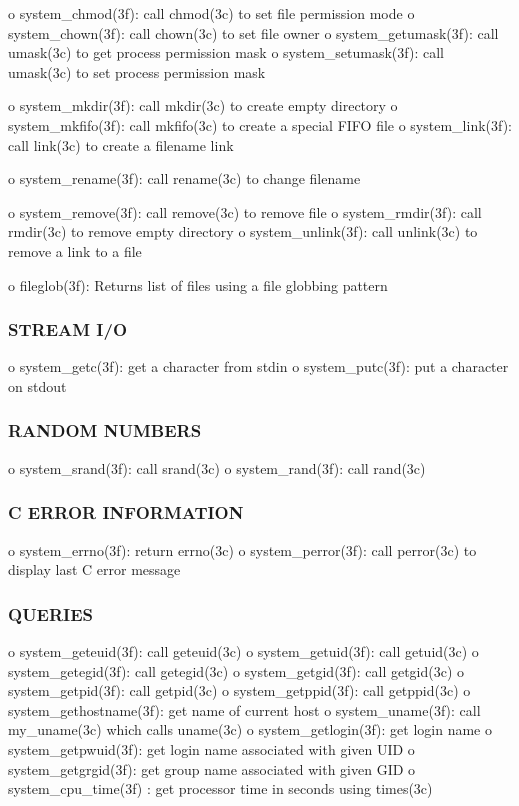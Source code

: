 o system\+\_\+chmod(3f)\+: call chmod(3c) to set file permission mode o system\+\_\+chown(3f)\+: call chown(3c) to set file owner o system\+\_\+getumask(3f)\+: call umask(3c) to get process permission mask o system\+\_\+setumask(3f)\+: call umask(3c) to set process permission mask

o system\+\_\+mkdir(3f)\+: call mkdir(3c) to create empty directory o system\+\_\+mkfifo(3f)\+: call mkfifo(3c) to create a special F\+I\+FO file o system\+\_\+link(3f)\+: call link(3c) to create a filename link

o system\+\_\+rename(3f)\+: call rename(3c) to change filename

o system\+\_\+remove(3f)\+: call remove(3c) to remove file o system\+\_\+rmdir(3f)\+: call rmdir(3c) to remove empty directory o system\+\_\+unlink(3f)\+: call unlink(3c) to remove a link to a file

o fileglob(3f)\+: Returns list of files using a file globbing pattern

\subsubsection*{S\+T\+R\+E\+AM I/O}

o system\+\_\+getc(3f)\+: get a character from stdin o system\+\_\+putc(3f)\+: put a character on stdout \subsubsection*{R\+A\+N\+D\+OM N\+U\+M\+B\+E\+RS}

o system\+\_\+srand(3f)\+: call srand(3c) o system\+\_\+rand(3f)\+: call rand(3c) \subsubsection*{C E\+R\+R\+OR I\+N\+F\+O\+R\+M\+A\+T\+I\+ON}

o system\+\_\+errno(3f)\+: return errno(3c) o system\+\_\+perror(3f)\+: call perror(3c) to display last C error message \subsubsection*{Q\+U\+E\+R\+I\+ES}

o system\+\_\+geteuid(3f)\+: call geteuid(3c) o system\+\_\+getuid(3f)\+: call getuid(3c) o system\+\_\+getegid(3f)\+: call getegid(3c) o system\+\_\+getgid(3f)\+: call getgid(3c) o system\+\_\+getpid(3f)\+: call getpid(3c) o system\+\_\+getppid(3f)\+: call getppid(3c) o system\+\_\+gethostname(3f)\+: get name of current host o system\+\_\+uname(3f)\+: call my\+\_\+uname(3c) which calls uname(3c) o system\+\_\+getlogin(3f)\+: get login name o system\+\_\+getpwuid(3f)\+: get login name associated with given U\+ID o system\+\_\+getgrgid(3f)\+: get group name associated with given G\+ID o system\+\_\+cpu\+\_\+time(3f) \+: get processor time in seconds using times(3c)

